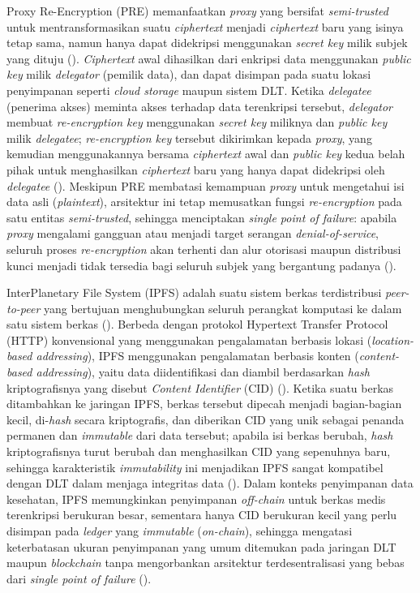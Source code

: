 Proxy Re-Encryption (PRE) memanfaatkan \textit{proxy} yang bersifat \textit{semi-trusted} untuk mentransformasikan suatu \textit{ciphertext} menjadi \textit{ciphertext} baru yang isinya tetap sama, namun hanya dapat didekripsi menggunakan \textit{secret key} milik subjek yang dituju (\cite{DecMed}). \textit{Ciphertext} awal dihasilkan dari enkripsi data menggunakan \textit{public key} milik \textit{delegator} (pemilik data), dan dapat disimpan pada suatu lokasi penyimpanan seperti \textit{cloud storage} maupun sistem DLT. Ketika \textit{delegatee} (penerima akses) meminta akses terhadap data terenkripsi tersebut, \textit{delegator} membuat \textit{re-encryption key} menggunakan \textit{secret key} miliknya dan \textit{public key} milik \textit{delegatee}; \textit{re-encryption key} tersebut dikirimkan kepada \textit{proxy}, yang kemudian menggunakannya bersama \textit{ciphertext} awal dan \textit{public key} kedua belah pihak untuk menghasilkan \textit{ciphertext} baru yang hanya dapat didekripsi oleh \textit{delegatee} (\cite{DecMed}). Meskipun PRE membatasi kemampuan \textit{proxy} untuk mengetahui isi data asli (\textit{plaintext}), arsitektur ini tetap memusatkan fungsi \textit{re-encryption} pada satu entitas \textit{semi-trusted}, sehingga menciptakan \textit{single point of failure}: apabila \textit{proxy} mengalami gangguan atau menjadi target serangan \textit{denial-of-service}, seluruh proses \textit{re-encryption} akan terhenti dan alur otorisasi maupun distribusi kunci menjadi tidak tersedia bagi seluruh subjek yang bergantung padanya (\cite{DecMed}).

InterPlanetary File System (IPFS) adalah suatu sistem berkas terdistribusi \textit{peer-to-peer} yang bertujuan menghubungkan seluruh perangkat komputasi ke dalam satu sistem berkas (\cite{benet2014ipfscontentaddressed}). Berbeda dengan protokol Hypertext Transfer Protocol (HTTP) konvensional yang menggunakan pengalamatan berbasis lokasi (\textit{location-based addressing}), IPFS menggunakan pengalamatan berbasis konten (\textit{content-based addressing}), yaitu data diidentifikasi dan diambil berdasarkan \textit{hash} kriptografisnya yang disebut \textit{Content Identifier} (CID) (\cite{DecMed}). Ketika suatu berkas ditambahkan ke jaringan IPFS, berkas tersebut dipecah menjadi bagian-bagian kecil, di-\textit{hash} secara kriptografis, dan diberikan CID yang unik sebagai penanda permanen dan \textit{immutable} dari data tersebut; apabila isi berkas berubah, \textit{hash} kriptografisnya turut berubah dan menghasilkan CID yang sepenuhnya baru, sehingga karakteristik \textit{immutability} ini menjadikan IPFS sangat kompatibel dengan DLT dalam menjaga integritas data (\cite{DecMed}). Dalam konteks penyimpanan data kesehatan, IPFS memungkinkan penyimpanan \textit{off-chain} untuk berkas medis terenkripsi berukuran besar, sementara hanya CID berukuran kecil yang perlu disimpan pada \textit{ledger} yang \textit{immutable} (\textit{on-chain}), sehingga mengatasi keterbatasan ukuran penyimpanan yang umum ditemukan pada jaringan DLT maupun \textit{blockchain} tanpa mengorbankan arsitektur terdesentralisasi yang bebas dari \textit{single point of failure} (\cite{DecMed}).

